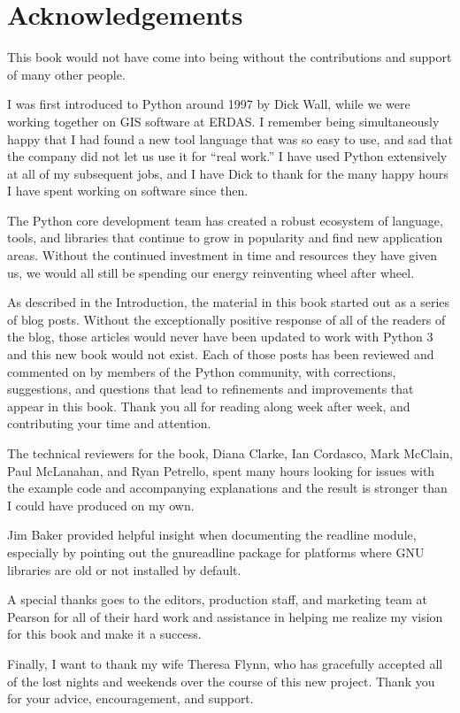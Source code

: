 \cleardoublepage
\chapter*{Acknowledgements}

\noindent This book would not have come into being without the contributions and
support of many other people.

I was first introduced to Python around 1997 by Dick Wall, while we
were working together on GIS software at ERDAS. I remember being
simultaneously happy that I had found a new tool language that was so
easy to use, and sad that the company did not let us use it for ``real
work.'' I have used Python extensively at all of my subsequent jobs,
and I have Dick to thank for the many happy hours I have spent working
on software since then.

The Python core development team has created a robust ecosystem of
language, tools, and libraries that continue to grow in popularity and
find new application areas. Without the continued investment in time
and resources they have given us, we would all still be spending our
energy reinventing wheel after wheel.

As described in the Introduction, the material in this book started
out as a series of blog posts. Without the exceptionally positive
response of all of the readers of the blog, those articles would never
have been updated to work with Python 3 and this new book would not
exist. Each of those posts has been reviewed and commented on by
members of the Python community, with corrections, suggestions, and
questions that lead to refinements and improvements that appear in
this book. Thank you all for reading along week after week, and
contributing your time and attention.

The technical reviewers for the book, Diana Clarke, Ian Cordasco, Mark
McClain, Paul McLanahan, and Ryan Petrello, spent many hours looking
for issues with the example code and accompanying explanations and the
result is stronger than I could have produced on my own.

Jim Baker provided helpful insight when documenting the readline
module, especially by pointing out the gnureadline package for
platforms where GNU libraries are old or not installed by default.

A special thanks goes to the editors, production staff, and marketing
team at Pearson for all of their hard work and assistance in helping
me realize my vision for this book and make it a success.

Finally, I want to thank my wife Theresa Flynn, who has gracefully
accepted all of the lost nights and weekends over the course of this
new project. Thank you for your advice, encouragement, and support.
